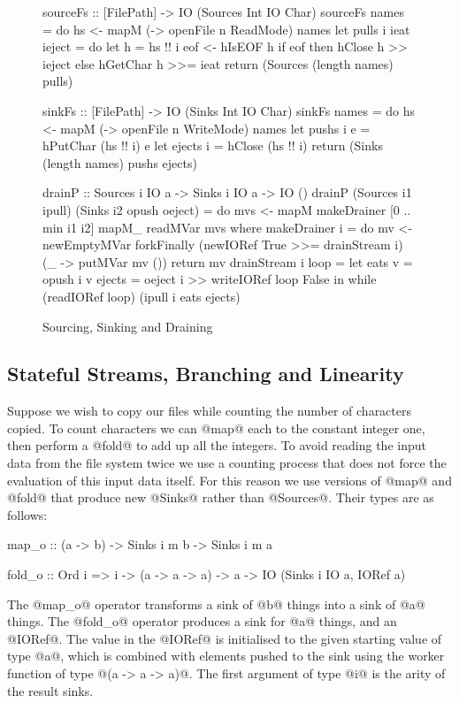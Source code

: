\begin{figure}
\begin{code}
sourceFs :: [FilePath] -> IO (Sources Int IO Char)
sourceFs names 
 = do hs <- mapM (\n -> openFile n ReadMode) names
      let pulls i ieat ieject
          = do let h = hs !! i
               eof <- hIsEOF h
               if eof then hClose   h >> ieject
                      else hGetChar h >>= ieat
      return (Sources (length names) pulls)

sinkFs  :: [FilePath] -> IO (Sinks Int IO Char)
sinkFs names 
 = do hs <- mapM (\n -> openFile n WriteMode) names
      let pushs  i e = hPutChar (hs !! i) e
      let ejects i   = hClose   (hs !! i)
      return (Sinks (length names) pushs ejects)

drainP :: Sources i IO a -> Sinks i IO a -> IO ()
drainP (Sources i1 ipull) (Sinks i2 opush oeject)
 = do mvs <- mapM makeDrainer [0 .. min i1 i2]
      mapM_ readMVar mvs
 where
  makeDrainer i = do
    mv <- newEmptyMVar
    forkFinally (newIORef True >>= drainStream i)
                (\_ -> putMVar mv ())
    return mv
  drainStream i loop =
    let eats v = opush i v
        ejects = oeject i >> writeIORef loop False
    in  while (readIORef loop) (ipull i eats ejects)
\end{code}

\caption{Sourcing, Sinking and Draining}
\label{f:Draining}
\end{figure}


\subsection{Stateful Streams, Branching and Linearity}
\label{s:Linearity}
Suppose we wish to copy our files while counting the number of characters copied.
To count characters we can @map@ each to the constant integer one, then perform a @fold@ to add up all the integers. To avoid reading the input data from the file system twice we use a counting process that does not force the evaluation of this input data itself. For this reason we use versions of @map@ and @fold@ that produce new @Sinks@ rather than @Sources@. Their types are as follows:
\begin{code}
map_o  :: (a -> b) -> Sinks i m b -> Sinks i m a

fold_o :: Ord i => i -> (a -> a -> a) -> a
                -> IO (Sinks i IO a, IORef a)
\end{code}
The @map_o@ operator transforms a sink of @b@ things into a sink of @a@ things. The @fold_o@ operator produces a sink for @a@ things, and an @IORef@. The value in the @IORef@ is initialised to the given starting value of type @a@, which is combined with elements pushed to the sink using the worker function of type @(a -> a -> a)@. The first argument of type @i@ is the arity of the result sinks. 

